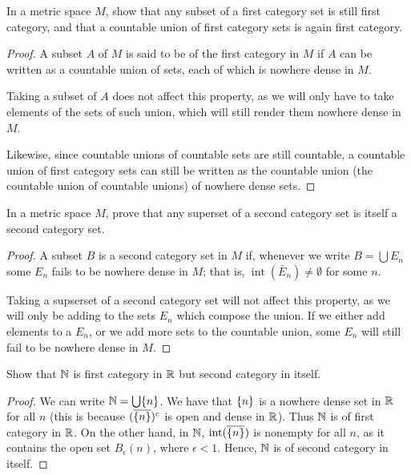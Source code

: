 \begin{exercise}{28}
In a metric space $M$, show that any subset of a first category set is still first category, and that a countable union of first category sets is again first category.
\end{exercise}
\begin{proof}
A subset $A$ of $M$ is said to be of the first category in $M$ if $A$ can be written as a countable union of sets, each of which is nowhere dense in $M$.

Taking a subset of $A$ does not affect this property, as we will only have to take elements of the sets of such union, which will still render them nowhere dense in $M$.

Likewise, since countable unions of countable sets are still countable, a countable union of first category sets can still be written as the countable union (the countable union of countable unions) of nowhere dense sets.
\end{proof} 

\begin{exercise}{29}
In a metric space $M$, prove that any superset of a second category set is itself a second category set.
\end{exercise}
\begin{proof}
A subset $B$ is a second category set in $M$ if, whenever we write $B = \bigcup E_n$ some $E_n$ fails to be nowhere dense in $M$;
that is, $\operatorname{int}(\bar{E}_n) \neq \emptyset$ for some $n$.

Taking a supserset of a second category set will not affect this property, as we will only be adding to the sets $E_n$ which compose the union.
If we either add elements to a $E_n$, or we add more sets to the countable union, some $E_n$ will still fail to be nowhere dense in $M$.
\end{proof} 

\begin{exercise}{30}
Show that $\mathbb{N}$ is first category in $\mathbb{R}$ but second category in itself.
\end{exercise}
\begin{proof}
We can write $\mathbb{N} = \bigcup \{n\}$.
We have that $\{n\}$ is a nowhere dense set in $\mathbb{R}$ for all $n$ (this is because $(\overline{\{n\}})^c$ is open and dense in $\mathbb{R}$).
Thus $\mathbb{N}$ is of first category in $\mathbb{R}$.
On the other hand, in $\mathbb{N}$, $\operatorname{int}(\overline{\{n\}})$ is nonempty for all $n$, as it contains the open set $B_\epsilon(n)$, where $\epsilon < 1$.
Hence, $\mathbb{N}$ is of second category in itself.
\end{proof} 

